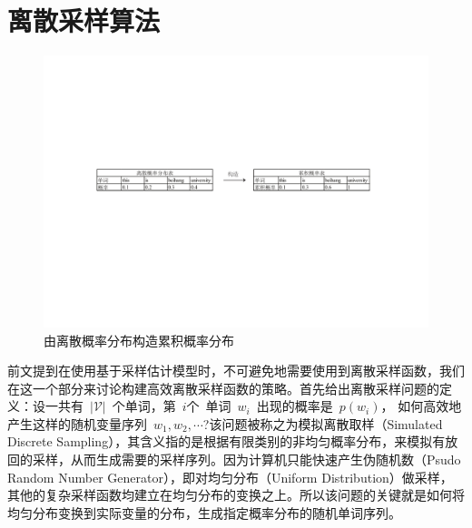 \section{离散采样算法}
\begin{figure}[!b]
  \centering
\includegraphics[width=1\linewidth]{./figures/cdfreverse.pdf}
\caption{由离散概率分布构造累积概率分布}\label{fig:cdf_reverse}
\end{figure}

前文提到在使用基于采样估计模型时，不可避免地需要使用到离散采样函数，我们在这一个部分来讨论构建高效离散采样函数的策略。首先给出离散采样问题的定义：设一共有~$|\mathcal{V}|$~个单词，第~$i$个~单词~$w_i$~出现的概率是~$p(w_i)$， 如何高效地产生这样的随机变量序列~$w_1,w_2,\cdots$?该问题被称之为模拟离散取样（Simulated Discrete Sampling），其含义指的是根据有限类别的非均匀概率分布，来模拟有放回的采样，从而生成需要的采样序列。因为计算机只能快速产生伪随机数（Psudo Random Number Generator），即对均匀分布（Uniform Distribution）做采样，其他的复杂采样函数均建立在均匀分布的变换之上。所以该问题的关键就是如何将均匀分布变换到实际变量的分布，生成指定概率分布的随机单词序列。

